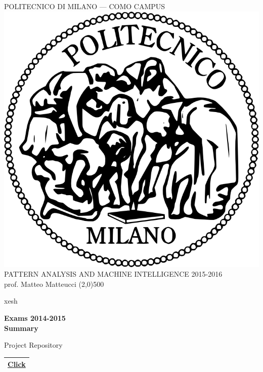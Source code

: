 \documentclass[a4paper,12pt,titlepage]{article} %
\begin{document}
	\begin{titlepage}
		
		\begin{center}
			POLITECNICO DI MILANO --- COMO CAMPUS\\
			\vspace{10pt}
			\includegraphics[scale=0.1]{logo-polimi.png}\\
			\vspace{10pt}
			PATTERN ANALYSIS AND MACHINE INTELLIGENCE 2015-2016\\
			prof. Matteo Matteucci	
			\line(2,0){500}
		\end{center}
		
		\vspace{60pt}
                xesh		
		\begin{center}
			{\Huge \textbf{Exams 2014-2015}}\\
			\vspace{20pt}	
			{\Huge \textbf{Summary}}\\
		\end{center}
		
		\vspace{60pt}
		
		\begin{center}
			{\large Project Repository}
		\end{center}
		\begin{tabularx}{\textwidth}{|X|}
			\hline
			\href{https://github.com/attillax/PAMI-2015}{Click}\\
			\hline
		\end{tabularx}
		

\end{titlepage}
\end{document}
